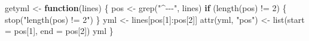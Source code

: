 \documentclass[
]{article}
\newenvironment{Shaded}{\begin{snugshade}}{\end{snugshade}}
\newcommand{\AttributeTok}[1]{\textcolor[rgb]{0.77,0.63,0.00}{#1}}
\newcommand{\ControlFlowTok}[1]{\textcolor[rgb]{0.13,0.29,0.53}{\textbf{#1}}}
\newcommand{\DecValTok}[1]{\textcolor[rgb]{0.00,0.00,0.81}{#1}}
\newcommand{\FunctionTok}[1]{\textcolor[rgb]{0.00,0.00,0.00}{#1}}
\newcommand{\NormalTok}[1]{#1}
\newcommand{\OtherTok}[1]{\textcolor[rgb]{0.56,0.35,0.01}{#1}}
\newcommand{\SpecialCharTok}[1]{\textcolor[rgb]{0.00,0.00,0.00}{#1}}
\newcommand{\StringTok}[1]{\textcolor[rgb]{0.31,0.60,0.02}{#1}}
\begin{document}
\begin{Shaded}
\begin{Highlighting}[]
\NormalTok{getyml }\OtherTok{\textless{}{-}} \ControlFlowTok{function}\NormalTok{(lines) \{}
\NormalTok{  pos }\OtherTok{\textless{}{-}} \FunctionTok{grep}\NormalTok{(}\StringTok{"\^{}{-}{-}{-}"}\NormalTok{, lines)}
  \ControlFlowTok{if}\NormalTok{ (}\FunctionTok{length}\NormalTok{(pos) }\SpecialCharTok{!=} \DecValTok{2}\NormalTok{) \{}
    \FunctionTok{stop}\NormalTok{(}\StringTok{"length(pos) != 2"}\NormalTok{)}
\NormalTok{  \}}
\NormalTok{  yml }\OtherTok{\textless{}{-}}\NormalTok{ lines[pos[}\DecValTok{1}\NormalTok{]}\SpecialCharTok{:}\NormalTok{pos[}\DecValTok{2}\NormalTok{]]}
  \FunctionTok{attr}\NormalTok{(yml, }\StringTok{"pos"}\NormalTok{) }\OtherTok{\textless{}{-}} \FunctionTok{list}\NormalTok{(}\AttributeTok{start =}\NormalTok{ pos[}\DecValTok{1}\NormalTok{], }\AttributeTok{end =}\NormalTok{ pos[}\DecValTok{2}\NormalTok{])}
\NormalTok{  yml}
\NormalTok{\}}


\end{Highlighting}
\end{Shaded}
\end{document}
